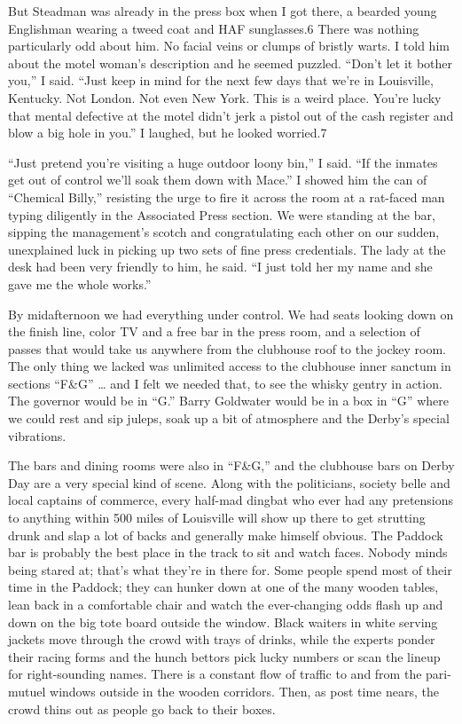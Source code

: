 \documentclass[10pt,a4paper]{article}
\begin{document}
But Steadman was already in the press box when I got there, a bearded young Englishman wearing a tweed coat and HAF sunglasses.6 There was nothing particularly odd about him. No facial veins or clumps of bristly warts. I told him about the motel woman’s description and he seemed puzzled. “Don’t let it bother you,” I said. “Just keep in mind for the next few days that we’re in Louisville, Kentucky. Not London. Not even New York. This is a weird place. You’re lucky that mental defective at the motel didn’t jerk a pistol out of the cash register and blow a big hole in you.” I laughed, but he looked worried.7

“Just pretend you’re visiting a huge outdoor loony bin,” I said. “If the inmates get out of control we’ll soak them down with Mace.” I showed him the can of “Chemical Billy,” resisting the urge to fire it across the room at a rat-faced man typing diligently in the Associated Press section. We were standing at the bar, sipping the management’s scotch and congratulating each other on our sudden, unexplained luck in picking up two sets of fine press credentials. The lady at the desk had been very friendly to him, he said. “I just told her my name and she gave me the whole works.”

By midafternoon we had everything under control. We had seats looking down on the finish line, color TV and a free bar in the press room, and a selection of passes that would take us anywhere from the clubhouse roof to the jockey room. The only thing we lacked was unlimited access to the clubhouse inner sanctum in sections “F\&G” … and I felt we needed that, to see the whisky gentry in action. The governor would be in “G.” Barry Goldwater would be in a box in “G” where we could rest and sip juleps, soak up a bit of atmosphere and the Derby’s special vibrations.

The bars and dining rooms were also in “F\&G,” and the clubhouse bars on Derby Day are a very special kind of scene. Along with the politicians, society belle and local captains of commerce, every half-mad dingbat who ever had any pretensions to anything within 500 miles of Louisville will show up there to get strutting drunk and slap a lot of backs and generally make himself obvious. The Paddock bar is probably the best place in the track to sit and watch faces. Nobody minds being stared at; that’s what they’re in there for. Some people spend most of their time in the Paddock; they can hunker down at one of the many wooden tables, lean back in a comfortable chair and watch the ever-changing odds flash up and down on the big tote board outside the window. Black waiters in white serving jackets move through the crowd with trays of drinks, while the experts ponder their racing forms and the hunch bettors pick lucky numbers or scan the lineup for right-sounding names. There is a constant flow of traffic to and from the pari-mutuel windows outside in the wooden corridors. Then, as post time nears, the crowd thins out as people go back to their boxes.
\end{document}
